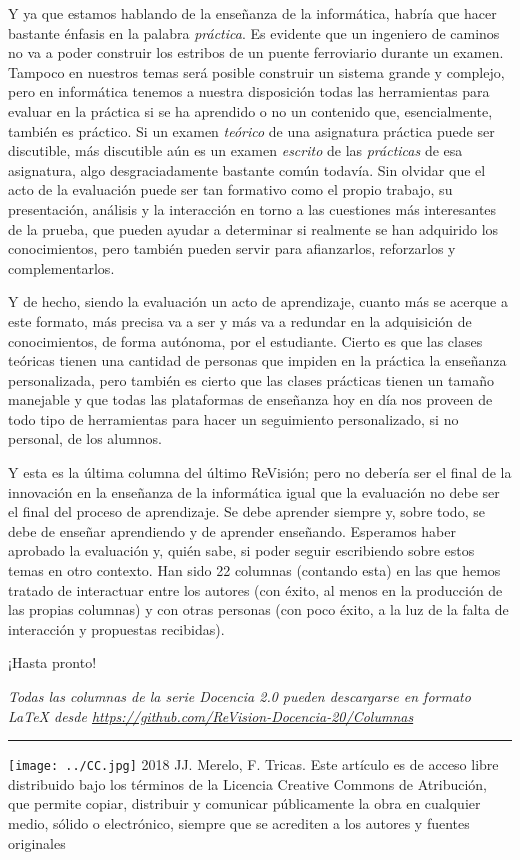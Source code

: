\documentclass[twoside,10pt]{article}
\newcommand{\surl}[1]{{\small\url{#1}}}
\begin{document}
\begin{multicols}{2}
Y ya que estamos hablando de la enseñanza de la informática, habría
que hacer bastante énfasis en la palabra {\em práctica}. Es evidente
que un ingeniero de caminos no va a poder construir los estribos de un
puente ferroviario durante un examen. Tampoco en nuestros temas será posible construir un sistema grande y complejo, pero en informática tenemos a
nuestra disposición todas las herramientas para evaluar en la práctica
si se ha aprendido o no un contenido que, esencialmente, también es
práctico. 
Si un examen {\em teórico} de una asignatura práctica puede ser discutible, más
discutible aún es un examen {\em escrito} de las {\em prácticas} de esa
asignatura, algo desgraciadamente bastante común todavía. 
Sin olvidar que el acto de la evaluación puede ser tan formativo como el propio trabajo, su
presentación, análisis y la interacción en torno a las cuestiones más
interesantes de la prueba, que pueden ayudar a determinar si realmente se han
adquirido los conocimientos, pero también pueden servir para afianzarlos,
reforzarlos y complementarlos.

Y de hecho, siendo la evaluación un acto de aprendizaje, cuanto más se
acerque a este formato, más precisa va a ser y más va a redundar en la
adquisición de conocimientos, de forma autónoma, por el
estudiante. Cierto es que las clases teóricas tienen una cantidad de
personas que impiden en la práctica la enseñanza personalizada, pero
también es cierto que las clases prácticas tienen un tamaño manejable
y que todas las plataformas de enseñanza hoy en día nos proveen de
todo tipo de herramientas para hacer un seguimiento personalizado, si
no personal, de los alumnos. 

Y esta es la última columna del último ReVisión; pero no debería ser el
final de la innovación en la enseñanza de la informática igual que la
evaluación no debe ser el final del proceso de aprendizaje. Se debe
aprender siempre y, sobre todo, se debe de enseñar aprendiendo y de
aprender enseñando.
Esperamos haber aprobado la evaluación y, quién sabe, si poder seguir
escribiendo sobre estos temas en otro contexto. Han sido 22 columnas
(contando esta) en las que hemos tratado de interactuar entre los
autores (con éxito, al menos en la producción de las propias columnas)
y con otras personas (con poco éxito, a la luz de la falta de
interacción y propuestas recibidas).  

¡Hasta pronto!

\noindent\emph{Todas las columnas de la serie Docencia 2.0
pueden descargarse en formato LaTeX desde
\surl{https://github.com/ReVision-Docencia-20/Columnas}}

\noindent\rule{90mm}{1pt}

{\small \noindent\texttt{[image: ../CC.jpg]} 2018 JJ. Merelo, F. Tricas. Este artículo es de acceso libre distribuido bajo los términos
de la Licencia Creative Commons de Atribución, que permite copiar,
distribuir y comunicar públicamente la obra en cualquier medio, sólido
o electrónico, siempre que se acrediten a los autores y fuentes
originales}

\end{multicols}
\end{document}
